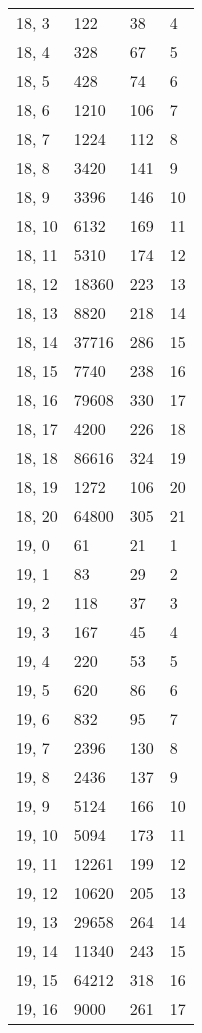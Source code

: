 \begin{table}
\begin{tabular}{llll}
18, 3  &     122 &   38 &     4 \\
18, 4  &     328 &   67 &     5 \\
18, 5  &     428 &   74 &     6 \\
18, 6  &    1210 &  106 &     7 \\
18, 7  &    1224 &  112 &     8 \\
18, 8  &    3420 &  141 &     9 \\
18, 9  &    3396 &  146 &    10 \\
18, 10 &    6132 &  169 &    11 \\
18, 11 &    5310 &  174 &    12 \\
18, 12 &   18360 &  223 &    13 \\
18, 13 &    8820 &  218 &    14 \\
18, 14 &   37716 &  286 &    15 \\
18, 15 &    7740 &  238 &    16 \\
18, 16 &   79608 &  330 &    17 \\
18, 17 &    4200 &  226 &    18 \\
18, 18 &   86616 &  324 &    19 \\
18, 19 &    1272 &  106 &    20 \\
18, 20 &   64800 &  305 &    21 \\
19, 0  &      61 &   21 &     1 \\
19, 1  &      83 &   29 &     2 \\
19, 2  &     118 &   37 &     3 \\
19, 3  &     167 &   45 &     4 \\
19, 4  &     220 &   53 &     5 \\
19, 5  &     620 &   86 &     6 \\
19, 6  &     832 &   95 &     7 \\
19, 7  &    2396 &  130 &     8 \\
19, 8  &    2436 &  137 &     9 \\
19, 9  &    5124 &  166 &    10 \\
19, 10 &    5094 &  173 &    11 \\
19, 11 &   12261 &  199 &    12 \\
19, 12 &   10620 &  205 &    13 \\
19, 13 &   29658 &  264 &    14 \\
19, 14 &   11340 &  243 &    15 \\
19, 15 &   64212 &  318 &    16 \\
19, 16 &    9000 &  261 &    17 \\

\end{tabular}
\end{table}
